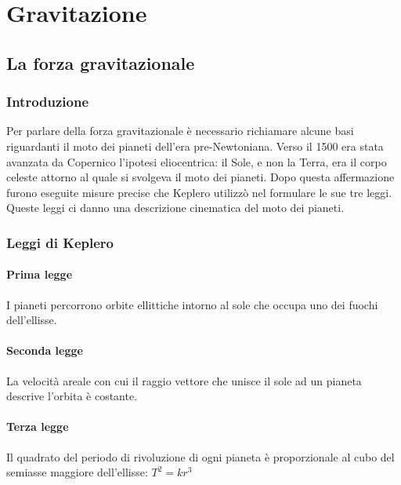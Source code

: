 \documentclass[class=book, crop=false, oneside, 12pt]{standalone}
\begin{document}
\chapter{Gravitazione}

\section{La forza gravitazionale}

\subsection{Introduzione}

Per parlare della forza gravitazionale è necessario richiamare alcune basi riguardanti il moto dei pianeti dell'era pre-Newtoniana.\newline
Verso il 1500 era stata avanzata da Copernico l'ipotesi eliocentrica: il Sole, e non la Terra, era il corpo celeste attorno al quale si svolgeva il moto dei pianeti.\newline
Dopo questa affermazione furono eseguite misure precise che Keplero utilizz\`o nel formulare le sue tre leggi.
Queste leggi ci danno una descrizione cinematica del moto dei pianeti.

\subsection{Leggi di Keplero}
\subsubsection{Prima legge}

I pianeti percorrono orbite ellittiche intorno al sole che occupa uno dei fuochi dell'ellisse. 

\subsubsection{Seconda legge}

La velocità areale con cui il raggio vettore che unisce il sole ad un pianeta descrive l'orbita è costante. 

\subsubsection{Terza legge}

Il quadrato del periodo di rivoluzione di ogni pianeta è proporzionale al cubo del semiasse maggiore dell'ellisse: $T^2 = k r^3$
\end{document}
